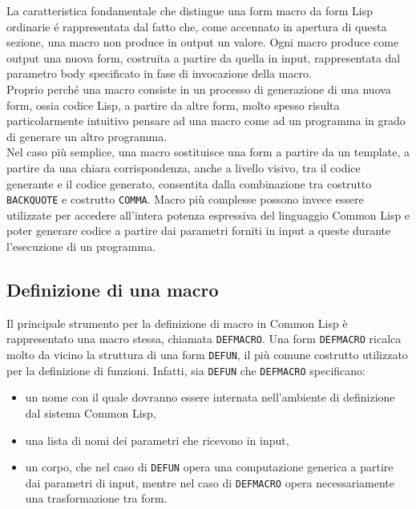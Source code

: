 La caratteristica fondamentale che distingue una form macro da form Lisp
ordinarie é rappresentata dal fatto che, come accennato in apertura di questa
sezione, una macro non produce in output un valore. Ogni macro produce come
output una nuova form, costruita a partire da quella in input, rappresentata dal
parametro body specificato in fase di invocazione della macro.\\

Proprio perché una macro consiste in un processo di generazione di una nuova
form, ossia codice Lisp, a partire da altre form, molto spesso risulta
particolarmente intuitivo pensare ad una macro come ad un programma in grado di
generare un altro programma.\\

Nel caso più semplice, una macro sostituisce una form a partire da un template,
a partire da una chiara corrispondenza, anche a livello visivo, tra il codice
generante e il codice generato, consentita dalla combinazione tra costrutto
\texttt{BACKQUOTE} e costrutto \texttt{COMMA}. Macro più complesse possono
invece essere utilizzate per accedere all’intera potenza espressiva del
linguaggio Common Lisp e poter generare codice a partire dai parametri forniti
in input a queste durante l’esecuzione di un programma.

\subsection{Definizione di una macro}

Il principale strumento per la definizione di macro in Common Lisp è
rappresentato una macro stessa, chiamata \texttt{DEFMACRO}. Una form
\texttt{DEFMACRO} ricalca molto da vicino la struttura di una form
\texttt{DEFUN}, il più comune costrutto utilizzato per la definizione di
funzioni. Infatti, sia \texttt{DEFUN} che \texttt{DEFMACRO} specificano:

\begin{itemize}

\item un nome con il quale dovranno essere internata nell'ambiente di
definizione dal sistema Common Lisp,

\item una lista di nomi dei parametri che ricevono in input,

\item un corpo, che nel caso di \texttt{DEFUN} opera una computazione generica a
partire dai parametri di input, mentre nel caso di \texttt{DEFMACRO} opera
necessariamente una trasformazione tra form.

\end{itemize}

